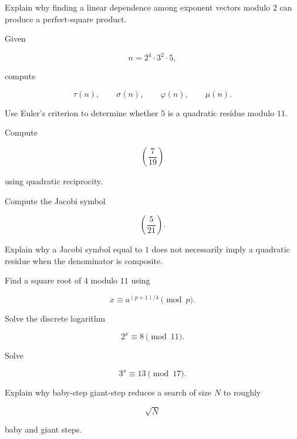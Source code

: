 \begin{exercise}[3]
Explain why finding a linear dependence among exponent vectors modulo \(2\)
can produce a perfect-square product.
\end{exercise}

\begin{exercise}[1]
Given

\[ n=2^4\cdot3^2\cdot5, \]

compute

\[ \tau(n),\qquad\sigma(n),\qquad\varphi(n),\qquad\mu(n). \]
\end{exercise}

\begin{exercise}[2]
Use Euler's criterion to determine whether \(5\) is a quadratic residue
modulo \(11\).
\end{exercise}

\begin{exercise}[2]
Compute

\[ \left(\frac{7}{19}\right) \]

using quadratic reciprocity.
\end{exercise}

\begin{exercise}[2]
Compute the Jacobi symbol

\[ \left(\frac{5}{21}\right). \]
\end{exercise}

\begin{exercise}[2]
Explain why a Jacobi symbol equal to \(1\) does not necessarily imply a
quadratic residue when the denominator is composite.
\end{exercise}

\begin{exercise}[2]
Find a square root of \(4\) modulo \(11\) using

\[ x\equiv a^{(p+1)/4}\pmod p. \]
\end{exercise}

\begin{exercise}[1]
Solve the discrete logarithm

\[ 2^x\equiv8\pmod{11}. \]
\end{exercise}

\begin{exercise}[2]
Solve

\[ 3^x\equiv13\pmod{17}. \]
\end{exercise}

\begin{exercise}[3]
Explain why baby-step giant-step reduces a search of size \(N\) to roughly

\[ \sqrt N \]

baby and giant steps.
\end{exercise}

